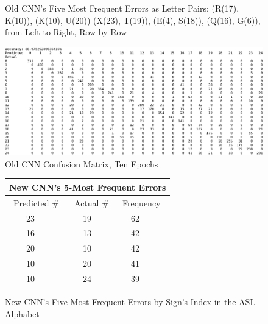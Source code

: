 \documentclass[11pt]{article}
\begin{document}
\begin{figure}[h]
\vspace{3mm}

\caption{Old CNN's Five Most Frequent Errors as Letter Pairs: (R(17), K(10)), (K(10), U(20)) (X(23), T(19)), (E(4), S(18)), (Q(16), G(6)), from Left-to-Right, Row-by-Row}
\end{figure}



\begin{figure}[H]
\begin{center}
\includegraphics[scale=0.44]{images/Old_Confusion_Matrix_10Epochs.png}
\caption{Old CNN Confusion Matrix, Ten Epochs}
\end{center}
\end{figure}

\begin{figure}[H]
\begin{center}
\begin{tabular}{ |p{2.2cm}||p{1.8cm}|p{1.8cm}| }
 \hline
 \multicolumn{3}{|c|}{New CNN's 5-Most Frequent Errors} \\
 \hline
 \ Predicted \# & Actual \# & Frequency\\
 \hline
 \ \ \ \ 23 & \ \ 19 & \ \ 62\\
  \ \ \ \ 16 & \ \ 13 & \ \ 42\\
   \ \ \ \ 20 &  \ \ 10 & \ \ 42\\
 \ \ \ \ 10 & \ \ 20 & \ \ 41\\
 \ \ \ \ 10 & \ \ 24 & \ \ 39\\
 \hline
\end{tabular}
\caption{New CNN's Five Most-Frequent Errors by Sign's Index in the ASL Alphabet}
\end{center}
\end{figure}
\end{document}
